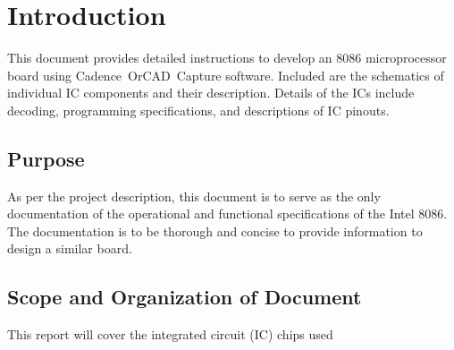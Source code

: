 \newpage
\section{Introduction}
This document provides detailed instructions to develop an 8086 microprocessor board using Cadence\textregistered \ OrCAD\textregistered \ Capture software. Included are the schematics of individual IC components and their description. Details of the ICs include decoding, programming specifications, and descriptions of IC pinouts.

    \subsection{Purpose}
    As per the project description, this document is to serve as the only documentation of the operational and functional specifications of the Intel 8086. The documentation is to be thorough and concise to provide information to design a similar board.

    \subsection{Scope and Organization of Document}
    This report will cover the integrated circuit (IC) chips used
